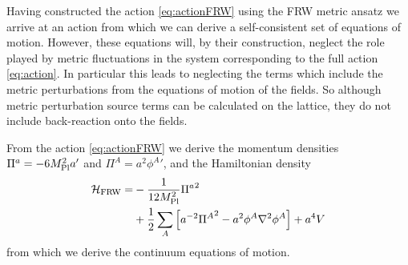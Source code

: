 Having constructed the action \eqref{eq:actionFRW} using the FRW metric ansatz we arrive at an action from which we can derive a self-consistent set of equations of motion. However, these equations will, by their construction, neglect the role played by metric fluctuations in the system corresponding to the full action \eqref{eq:action}.%
In particular this leads to neglecting the terms which include the metric perturbations from the equations of motion of the fields. So although metric perturbation source terms can be calculated on the lattice, they do not include back-reaction onto the fields.

From the action \eqref{eq:actionFRW} we derive the momentum densities $\Pi^a=-6M_{\mathrm{Pl}}^2a'$ and $\Pi^A=a^2{\phi^A}'$, and the Hamiltonian density
\begin{align} \label{eq:hamFRW}
  \begin{split}
    \mathcal{H}_\mathrm{FRW} = &-\frac{1}{12M_{\mathrm{Pl}}^2}{\Pi^a}^2 \\
    &+ \frac{1}{2}\sum_A\left[ a^{-2}{\Pi^A}^2 -a^2\phi^A\nabla^2\phi^A \right] +a^4V
    \end{split}
\end{align}
from which we derive the continuum equations of motion.

